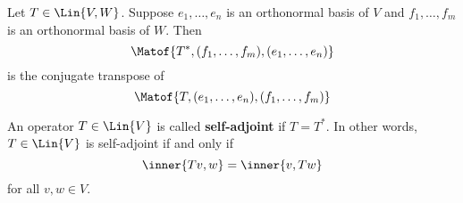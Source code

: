 \begin{theorem} 
    Let $T \in \Lin{V, W}$. Suppose $e_1, \dots, e_n$ is an orthonormal basis of $V$ and
    $f_1, \dots, f_m$ is an orthonormal basis of $W$. Then
    \[ \Matof{T^*, (f_1, \dots, f_m), (e_1, \dots, e_n)} \]
    is the conjugate transpose of
    \[ \Matof{T, (e_1, \dots, e_n), (f_1, \dots, f_m)} \]
\end{theorem}

\begin{definition}
    An operator $T \in \Lin{V}$ is called \textbf{self-adjoint} if $T = T^*$. In other words, $T \in \Lin{V}$ is
    self-adjoint if and only if
    \[ \inner{Tv, w} = \inner{v, Tw} \]
    for all $v, w \in V$.
\end{definition}
\endinput